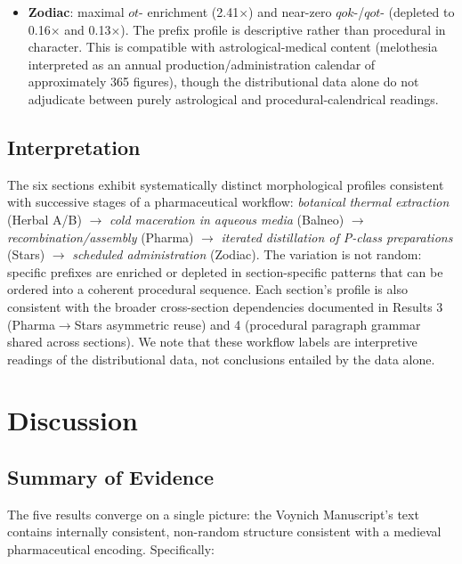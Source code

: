 \documentclass[11pt,a4paper]{article}
\begin{document}
\begin{itemize}[leftmargin=*,itemsep=4pt]
\item \textbf{Zodiac}: maximal $ot$- enrichment (2.41$\times$) and near-zero $qok$-/$qot$- (depleted to 0.16$\times$ and 0.13$\times$). The prefix profile is descriptive rather than procedural in character. This is compatible with astrological-medical content (melothesia interpreted as an annual production/administration calendar of approximately 365 figures), though the distributional data alone do not adjudicate between purely astrological and procedural-calendrical readings.
\end{itemize}

\subsection{Interpretation}

The six sections exhibit systematically distinct morphological profiles consistent with successive stages of a pharmaceutical workflow: \textit{botanical thermal extraction} (Herbal A/B) $\to$ \textit{cold maceration in aqueous media} (Balneo) $\to$ \textit{recombination/assembly} (Pharma) $\to$ \textit{iterated distillation of P-class preparations} (Stars) $\to$ \textit{scheduled administration} (Zodiac). The variation is not random: specific prefixes are enriched or depleted in section-specific patterns that can be ordered into a coherent procedural sequence. Each section's profile is also consistent with the broader cross-section dependencies documented in Results 3 (Pharma$\to$Stars asymmetric reuse) and 4 (procedural paragraph grammar shared across sections). We note that these workflow labels are interpretive readings of the distributional data, not conclusions entailed by the data alone.

\section{Discussion}

\subsection{Summary of Evidence}

The five results converge on a single picture: the Voynich Manuscript's text contains internally consistent, non-random structure consistent with a medieval pharmaceutical encoding. Specifically:
\end{document}
